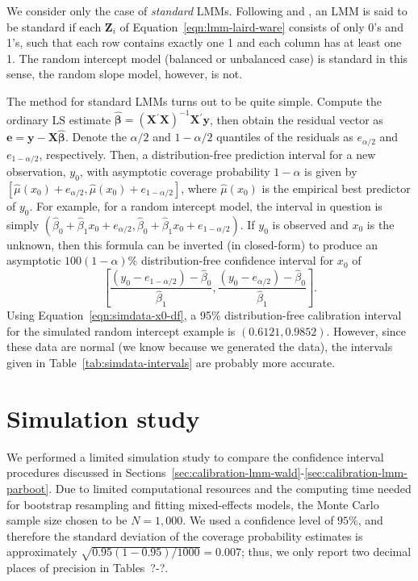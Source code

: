 \documentclass[cmfont,usenames,dvipsnames,leqno]{afit-etd}\usepackage[]{graphicx}\usepackage[]{color}
\newcommand{\trans}{\ensuremath{^\prime}}
\newcommand{\wh}[1]{\ensuremath{\widehat{#1}}}
\newcommand{\X}{\ensuremath{\bm{X}}}
\newcommand{\Z}{\ensuremath{\bm{Z}}}
\begin{document}
We consider only the case of \textit{standard} LMMs. Following \citet{jiang_distribution_2002} and \citet{jiang_linear_2007}, an \ac{LMM} is said to be standard if each $\Z_i$ of Equation~\eqref{eqn:lmm-laird-ware} consists of only 0's and 1's, such that each row contains exactly one 1 and each column has at least one 1. The random intercept model (balanced or unbalanced case) is standard in this sense, the random slope model, however, is not. 

The method for standard LMMs turns out to be quite simple. Compute the ordinary \ac{LS} estimate $\wh{\bm{\beta}} = \left(\X\trans\X\right)^{-1}\X\trans\bm{y}$, then obtain the residual vector as $\bm{e} = \bm{y} - \X\wh{\bm{\beta}}$. Denote the $\alpha/2$ and $1-\alpha/2$ quantiles of the residuals as $e_{\alpha/2}$ and $e_{1-\alpha/2}$, respectively. Then, a distribution-free prediction interval for a new observation, $y_0$, with asymptotic coverage probability $1-\alpha$ is given by
$\left[\wh{\mu}(x_0) + e_{\alpha/2}, \wh{\mu}(x_0) + e_{1-\alpha/2}\right]$, where $\wh{\mu}(x_0)$ is the empirical best predictor of $y_0$. For example, for a random intercept model, the interval in question is simply $\left(\wh{\beta}_0 + \wh{\beta}_1 x_0 + e_{\alpha/2}, \wh{\beta}_0 + \wh{\beta}_1 x_0 + e_{1-\alpha/2}\right)$. If $y_0$ is observed and $x_0$ is the unknown, then this formula can be inverted (in closed-form) to produce an asymptotic $100(1-\alpha)\%$ distribution-free confidence interval for $x_0$ of
\begin{equation} 
\label{eqn:simdata-x0-df}
  \left[ \frac{\left(y_0 - e_{1-\alpha/2}\right) - \wh{\beta}_0}{\wh{\beta}_1}, \frac{\left(y_0 - e_{\alpha/2}\right) - \wh{\beta}_0}{\wh{\beta}_1} \right].
\end{equation}
Using Equation~\eqref{eqn:simdata-x0-df}, a 95\% distribution-free calibration interval for the simulated random intercept example is $(0.6121, 0.9852)$. However, since these data are normal (we know because we generated the data), the intervals given in Table~\ref{tab:simdata-intervals} are probably more accurate. 

\section{Simulation study}
\label{sec:simulation-study}
We performed a limited simulation study to compare the confidence interval procedures discussed in Sections~\ref{sec:calibration-lmm-wald}-\ref{sec:calibration-lmm-parboot}. Due to limited computational resources and the computing time needed for bootstrap resampling and fitting mixed-effects models, the Monte Carlo sample size chosen to be $N = 1,000$. We used a confidence level of $95\%$, and therefore the standard deviation of the coverage probability estimates is approximately $\sqrt{0.95\left(1-0.95\right)/1000} = 0.007$; thus, we only report two decimal places of precision in Tables~?-?.
\end{document}
